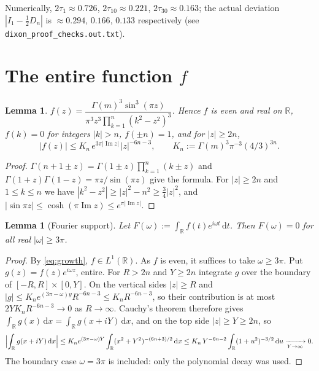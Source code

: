 \documentclass[11pt]{amsart}
\newtheorem{lemma}[theorem]{Lemma}
\theoremstyle{remark}
\newcommand{\R}{\mathbb{R}}
\newcommand{\dd}{\,\mathrm{d}}
\begin{document}
Numerically, $2\tau_1\approx0.726$, $2\tau_{10}\approx0.221$, $2\tau_{30}\approx0.163$; the actual deviation $|I_1-\frac12D_n|$ is
$\approx0.294$, $0.166$, $0.133$ respectively (see \texttt{dixon\_proof\_checks.out.txt}).

\section{The entire function \texorpdfstring{$f$}{f}}

\begin{lemma}\label{lem:closed}
$f(z)=\dfrac{\Gamma(m)^3\sin^3(\pi z)}{\pi^3 z^3\prod_{k=1}^{n}(k^2-z^2)^3}$. Hence $f$ is even and real on $\R$,
$f(k)=0$ for integers $|k|>n$, $f(\pm n)=1$, and for $|z|\ge 2n$,
\begin{equation}\label{eq:growth}
|f(z)|\le K_n\,e^{3\pi|\operatorname{Im}z|}\,|z|^{-6n-3},\qquad K_n:=\Gamma(m)^3\pi^{-3}(4/3)^{3n}.
\end{equation}
\end{lemma}

\begin{proof}
$\Gamma(n+1\pm z)=\Gamma(1\pm z)\prod_{k=1}^n(k\pm z)$ and $\Gamma(1+z)\Gamma(1-z)=\pi z/\sin(\pi z)$ give the formula.
For $|z|\ge2n$ and $1\le k\le n$ we have $|k^2-z^2|\ge|z|^2-n^2\ge\frac34|z|^2$, and $|\sin\pi z|\le\cosh(\pi\operatorname{Im}z)\le e^{\pi|\operatorname{Im}z|}$.
\end{proof}

\begin{lemma}[Fourier support]\label{lem:pw}
Let $F(\omega):=\int_\R f(t)e^{i\omega t}\dd t$. Then $F(\omega)=0$ for all real $|\omega|\ge3\pi$.
\end{lemma}

\begin{proof}
By \eqref{eq:growth}, $f\in L^1(\R)$. As $f$ is even, it suffices to take $\omega\ge3\pi$. Put $g(z)=f(z)e^{i\omega z}$, entire.
For $R>2n$ and $Y\ge2n$ integrate $g$ over the boundary of $[-R,R]\times[0,Y]$. On the vertical sides $|z|\ge R$ and
$|g|\le K_n e^{(3\pi-\omega)y}R^{-6n-3}\le K_nR^{-6n-3}$, so their contribution is at most $2YK_nR^{-6n-3}\to0$ as $R\to\infty$.
Cauchy's theorem therefore gives $\int_\R g(x)\dd x=\int_\R g(x+iY)\dd x$, and on the top side $|z|\ge Y\ge2n$, so
\[
\Bigl|\int_\R g(x+iY)\dd x\Bigr|\le K_n e^{(3\pi-\omega)Y}\int_\R (x^2+Y^2)^{-(6n+3)/2}\dd x
\le K_n\,Y^{-6n-2}\int_\R(1+u^2)^{-3/2}\dd u\xrightarrow[Y\to\infty]{}0 .
\]
The boundary case $\omega=3\pi$ is included: only the polynomial decay was used.
\end{proof}
\end{document}
